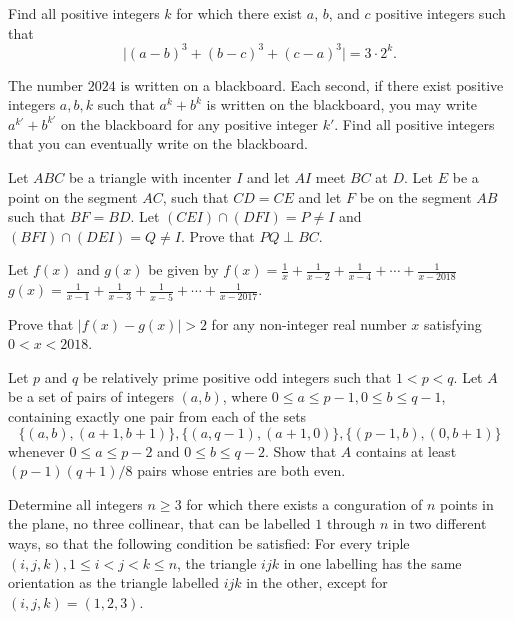 \documentclass[11pt]{scrartcl}
\begin{document}
\begin{problem}[143039642317874]
Find all positive integers $k$ for which there exist $a$, $b$, and $c$ positive integers such that\[\lvert (a-b)^3+(b-c)^3+(c-a)^3\rvert=3\cdot2^k.\]
\end{problem}
\begin{problem}[2792820689505589235]
	The number $2024$ is written on a blackboard. Each second, if there exist positive integers $a,b,k$ such that $a^k+b^k$ is written on the blackboard, you may write $a^{k'}+b^{k'}$ on the blackboard for any positive integer $k'.$ Find all positive integers that you can eventually write on the blackboard.
\end{problem}
\begin{problem}[748238852463934]
	Let $ABC$ be a triangle with incenter $I$ and let $AI$ meet $BC$ at $D$. Let $E$ be a point on the segment $AC$, such that $CD=CE$ and let $F$ be on the segment $AB$ such that $BF=BD$. Let $(CEI) \cap (DFI)=P \neq I$ and $(BFI) \cap (DEI)=Q \neq I$. Prove that $PQ \perp BC$.
\end{problem}
\begin{problem}[3427992889083230961]
Let $f(x)$ and $g(x)$ be given by
$f(x) = \frac{1}{x} + \frac{1}{x-2} + \frac{1}{x-4} + \cdots + \frac{1}{x-2018}$
$g(x) = \frac{1}{x-1} + \frac{1}{x-3} + \frac{1}{x-5} + \cdots + \frac{1}{x-2017}$.

Prove that $|f(x)-g(x)| >2$ for any non-integer real number $x$ satisfying $0 < x < 2018$.
\end{problem}
\begin{problem}[2599680620339408367]
Let $p$ and $q$ be relatively prime positive odd integers such that $1 < p < q$. Let $A$ be a set of pairs of integers $(a, b)$, where $0 \le a \le p - 1, 0 \le b \le q - 1$, containing exactly one pair from each of the sets$$\{(a, b),(a + 1, b + 1)\},  \{(a, q - 1), (a + 1, 0)\}, \{(p - 1,b),(0, b + 1)\}$$whenever $0 \le a \le p - 2$ and $0 \le b \le q - 2$. Show that $A$ contains at least $(p - 1)(q + 1)/8$ pairs whose entries are both even.
\end{problem}
\begin{problem}[887161908366621]
Determine all integers $n \geq 3$ for which there exists a conguration of $n$ points in the plane, no three collinear, that can be labelled $1$ through $n$ in two different ways, so that the following
condition be satisfied: For every triple $(i,j,k), 1 \leq i < j < k \leq n$, the triangle $ijk$ in one labelling has the same orientation as the triangle labelled $ijk$ in the other, except for $(i,j,k) = (1,2,3)$.
\end{problem}
\end{document}
